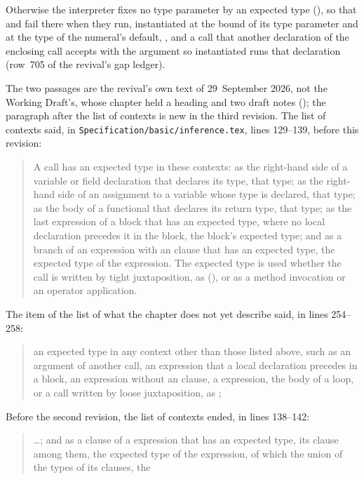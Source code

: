 \begin{description}
Otherwise the interpreter fixes no type
parameter by an expected type (), so that
 and  fail there
when they run,  instantiated at the bound of its type parameter and
 at the type of the numeral's default, , and a call that another declaration of the
enclosing call accepts with the argument so instantiated runs that declaration
(row~705 of the revival's gap ledger).
\item[Original text] The two passages are the revival's own text of
29~September 2026, not the Working Draft's, whose chapter held a heading and two
draft notes (); the paragraph after the list of
contexts is new in the third revision.
The list of contexts said, in \nolinkurl{Specification/basic/inference.tex},
lines 129--139, before this revision:
\begin{quote}
A call has an expected type in these contexts: as the right-hand side of a
variable or field declaration that declares its type, that type; as the
right-hand side of an assignment to a variable whose type is declared, that
type; as the body of a functional that declares its return type, that type;
as the last expression of a block that has an expected type, where no local
declaration precedes it in the block, the block's expected type; and as a
branch of an  expression with an  clause that has an
expected type, the expected type of the  expression.
The expected type is used whether the call is written by tight juxtaposition,
as  (), or as a method invocation or an operator
application.
\end{quote}
The item of the list of what the chapter does not yet describe said, in lines
254--258:
\begin{quote}
an expected type in any context other than those listed above, such as
an argument of another call, an expression that a local declaration precedes in
a block, an  expression without an  clause, a 
expression, the body of a  loop, or a call written by loose
juxtaposition, as ;
\end{quote}
Before the second revision, the list of contexts ended, in lines 138--142:
\begin{quote}
\ldots; and as a clause of a  expression that has an expected
type, its  clause among them, the expected type of the
 expression, of which the union of the types of its clauses, the

\end{quote}
\end{description}
